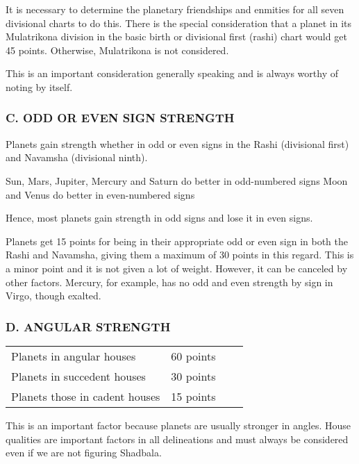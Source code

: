 It is necessary to determine the planetary friendships and enmities for all seven divisional charts to do this. There is the special consideration that a planet in its Mulatrikona division in the basic birth or divisional first (rashi) chart would get 45 points. Otherwise, Mulatrikona is not considered.

 

This is an important consideration generally speaking and is always worthy of noting by itself.

 

\subsubsection{C. ODD OR EVEN SIGN STRENGTH}

 

Planets gain strength whether in odd or even signs in the Rashi (divisional first) and Navamsha (divisional ninth).

Sun, Mars, Jupiter, Mercury and Saturn do better in odd-numbered signs
Moon and Venus do better in even-numbered signs
 

Hence, most planets gain strength in odd signs and lose it in even signs.

 

Planets get 15 points for being in their appropriate odd or even sign in both the Rashi and Navamsha, giving them a maximum of 30 points in this regard. This is a minor point and it is not given a lot of weight. However, it can be canceled by other factors. Mercury, for example, has no odd and even strength by sign in Virgo, though exalted.

 

\subsubsection{D. ANGULAR STRENGTH}

 
\begin{center}
\begin{tabular}{ l l l l}
Planets in angular houses	 &60 points               \\
Planets in succedent houses	& 30 points               \\
Planets those in cadent houses	 &15 points               \\
 \end{tabular}
\end{center}

This is an important factor because planets are usually stronger in angles. House qualities are important factors in all delineations and must always be considered even if we are not figuring Shadbala.

